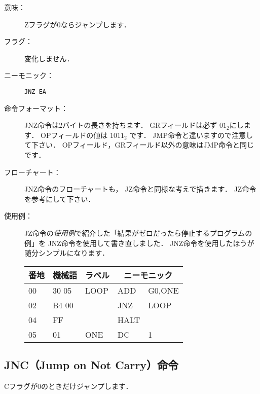 \begin{description}
\item[意味：]Zフラグが0ならジャンプします．

\item[フラグ：]変化しません．

\item[ニーモニック：]\texttt{JNZ  EA} 

\item[命令フォーマット：]JNZ命令は2バイトの長さを持ちます．
  GRフィールドは必ず $01_2$にします．
  OPフィールドの値は $1011_2$ です．
  JMP命令と違いますので注意して下さい．
  OPフィールド，GRフィールド以外の意味はJMP命令と同じです．


\item[フローチャート：]JNZ命令のフローチャートも，
  JZ命令と同様な考えで描きます．
  JZ命令を参考にして下さい．

\item[使用例：]
  JZ命令の\emph{使用例}で紹介した「結果がゼロだったら停止するプログラムの例」を
  JNZ命令を使用して書き直しました．
  JNZ命令を使用したほうが随分シンプルになります．

  {\ttfamily\small\begin{center}
    \begin{tabular}{|l|l|l|l l|} \hline
      番地 & 機械語 & ラベル & \multicolumn{2}{|c|}{ニーモニック} \\
      \hline
      00 & 30 05 & LOOP & ADD  & G0,ONE  \\
      02 & B4 00 &      & JNZ  & LOOP    \\
      04 & FF    &      & HALT &         \\
      05 & 01    & ONE  & DC   & 1       \\
      \hline
    \end{tabular}
  \end{center}}
\end{description}

\subsection{JNC（Jump on Not Carry）命令}
Cフラグが0のときだけジャンプします．

